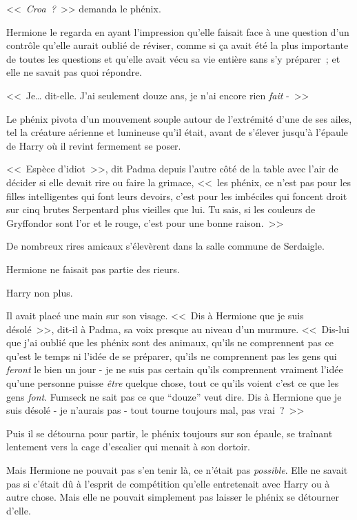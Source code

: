 <<~\emph{Croa~?}~>> demanda le phénix.

Hermione le regarda en ayant l'impression qu'elle faisait face à une question d'un contrôle qu'elle aurait oublié de réviser, comme si ça avait été la plus importante de toutes les questions et qu'elle avait vécu sa vie entière sans s'y préparer~; et elle ne savait pas quoi répondre.

<<~Je… dit-elle. J'ai seulement douze ans, je n'ai encore rien \emph{fait} -~>>

Le phénix pivota d'un mouvement souple autour de l'extrémité d'une de ses ailes, tel la créature aérienne et lumineuse qu'il était, avant de s'élever jusqu'à l'épaule de Harry où il revint fermement se poser.

<<~Espèce d'idiot~>>, dit Padma depuis l'autre côté de la table avec l'air de décider si elle devait rire ou faire la grimace, <<~les phénix, ce n'est pas pour les filles intelligentes qui font leurs devoirs, c'est pour les imbéciles qui foncent droit sur cinq brutes Serpentard plus vieilles que lui. Tu sais, si les couleurs de Gryffondor sont l'or et le rouge, c'est pour une bonne raison.~>>

De nombreux rires amicaux s'élevèrent dans la salle commune de Serdaigle.

Hermione ne faisait pas partie des rieurs.

Harry non plus.

Il avait placé une main sur son visage. <<~Dis à Hermione que je suis désolé~>>, dit-il à Padma, sa voix presque au niveau d'un murmure. <<~Dis-lui que j'ai oublié que les phénix sont des animaux, qu'ils ne comprennent pas ce qu'est le temps ni l'idée de se préparer, qu'ils ne comprennent pas les gens qui \emph{feront} le bien un jour - je ne suis pas certain qu'ils comprennent vraiment l'idée qu'une personne puisse \emph{être} quelque chose, tout ce qu'ils voient c'est ce que les gens \emph{font}. Fumseck ne sait pas ce que “douze” veut dire. Dis à Hermione que je suis désolé - je n'aurais pas - tout tourne toujours mal, pas vrai~?~>>

Puis il se détourna pour partir, le phénix toujours sur son épaule, se traînant lentement vers la cage d'escalier qui menait à son dortoir.

Mais Hermione ne pouvait pas s'en tenir là, ce n'était pas \emph{possible}. Elle ne savait pas si c'était dû à l'esprit de compétition qu'elle entretenait avec Harry ou à autre chose. Mais elle ne pouvait simplement pas laisser le phénix se détourner d'elle.

